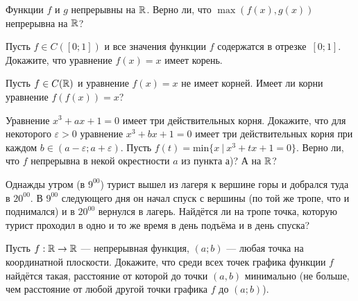 \documentclass[a4paper,11pt]{article}
\begin{document}
Функции $f$ и $g$ непрерывны на $\mathbb{R}$.
Верно ли, что $\max(f(x),g(x))$
непрерывна на $\mathbb{R}$?

Пусть $f\in C([0;1])$ и все значения функции $f$ содержатся в
отрезке~$[0;1]$. Докажите, что уравнение $f(x)=x$ имеет корень.




Пусть $f\in C(\mathbb{R})$ и уравнение $f(x)=x$ не имеет корней.
Имеет ли корни уравнение $f(f(x))=x$?



  Уравнение $x^3+ax+1=0$ имеет три действительных корня.
Докажите, что для некоторого $\varepsilon>0$ уравнение $x^3+bx+1=0$ имеет три
действительных корня при каждом $b\in(a-\varepsilon;a+\varepsilon)$.
 Пусть $f(t)=\text{min}\{x\ |\ x^3+tx+1=0\}$. Верно ли, что $f$ непрерывна в некой окрестности $a$ из пункта а)? А на $\mathbb{R}$?


\vspace*{-1mm}

\vspace*{-2mm}
Однажды утром (в $9^{00}$) турист вышел из лагеря к вершине горы и добрался туда в $20^{00}$.
В $9^{00}$ следующего дня он начал спуск с вершины (по той же тропе,
что и поднимался) и в $20^{00}$ вернулся в лагерь.
Найд\"ется ли на тропе точка, которую турист
проходил в одно и то же время %
в день подъ\"ема и в день спуска?

Пусть $f:\mathbb{R}\rightarrow\mathbb{R}$ --- непрерывная функция, $(a;b)$ --- любая точка
на координатной плоскости. Докажите, что среди всех точек графика функции $f$
найд\"ется такая, расстояние от которой до точки $(a,b)$ минимально
(не больше, чем расстояние от любой другой точки графика $f$ до
$(a;b)$).
\end{document}
